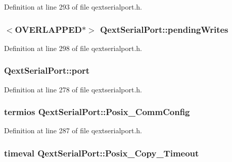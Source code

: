Definition at line 293 of file qextserialport.\-h.

\hypertarget{class_qext_serial_port_a49a6027bd1fe91c8df5b9f5cfa6c7ac2}{
\subsubsection[{pending\-Writes}]{$<$O\-V\-E\-R\-L\-A\-P\-P\-E\-D$\ast$$>$ Qext\-Serial\-Port\-::pending\-Writes\hspace{0.3cm}{\ttfamily [protected]}}}\label{class_qext_serial_port_a49a6027bd1fe91c8df5b9f5cfa6c7ac2}


Definition at line 298 of file qextserialport.\-h.

\hypertarget{class_qext_serial_port_a5fd2b5c7a55162199121ff572bbee727}{
\subsubsection[{port}]{ Qext\-Serial\-Port\-::port\hspace{0.3cm}{\ttfamily [protected]}}}\label{class_qext_serial_port_a5fd2b5c7a55162199121ff572bbee727}


Definition at line 278 of file qextserialport.\-h.

\hypertarget{class_qext_serial_port_a6df36ef68dd1686802899ce3f8200e8a}{
\subsubsection[{Posix\-\_\-\-Comm\-Config}]{ termios Qext\-Serial\-Port\-::\-Posix\-\_\-\-Comm\-Config\hspace{0.3cm}{\ttfamily [protected]}}}\label{class_qext_serial_port_a6df36ef68dd1686802899ce3f8200e8a}


Definition at line 287 of file qextserialport.\-h.

\hypertarget{class_qext_serial_port_af6149c83e334653cc2b33139aec3f733}{
\subsubsection[{Posix\-\_\-\-Copy\-\_\-\-Timeout}]{ timeval Qext\-Serial\-Port\-::\-Posix\-\_\-\-Copy\-\_\-\-Timeout\hspace{0.3cm}{\ttfamily [protected]}}}\label{class_qext_serial_port_af6149c83e334653cc2b33139aec3f733}


